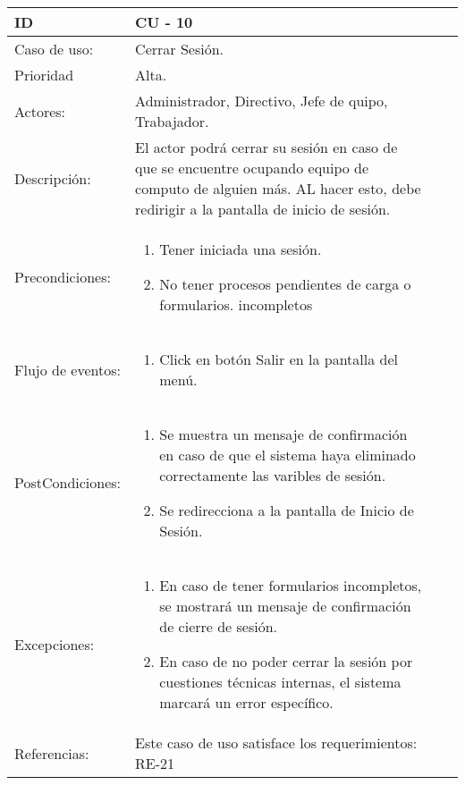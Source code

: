 \documentclass[11pt,a4paper]{article}
\begin{document}
\begin{tabular}[c]{|p{3cm}|p{13cm}|p{2.5cm}|p{3cm}|}
\hline 
\rule[-1ex]{0pt}{2.5ex} ID & CU - 10 \\ 
\hline 
\rule[-1ex]{0pt}{2.5ex} Caso de uso: & Cerrar Sesión. \\ 
\hline 
\rule[-1ex]{0pt}{2.5ex} Prioridad & Alta. \\ 
\hline 
\rule[-1ex]{0pt}{2.5ex} Actores: & Administrador, Directivo, Jefe de quipo, Trabajador.\\ 
\hline 
\rule[-1ex]{0pt}{2.5ex} Descripción: & El actor podrá cerrar su sesión en caso de que se encuentre ocupando
equipo de computo de alguien más. AL hacer esto, debe redirigir a la pantalla de inicio de sesión. \\ 
\hline 
\rule[-1ex]{0pt}{2.5ex}Precondiciones: & \begin{enumerate}
\item Tener iniciada una sesión.
\item No tener procesos pendientes de carga o formularios. incompletos \end{enumerate} \\ 
\hline 
\rule[-1ex]{0pt}{2.5ex} Flujo de eventos: & \begin{enumerate} 
\item Click en botón Salir en la pantalla del menú.
\end{enumerate}
\\ 
\hline 
\rule[-1ex]{0pt}{2.5ex} PostCondiciones:& \begin{enumerate}  
\item Se muestra un mensaje de confirmación en caso de que el sistema haya eliminado correctamente las varibles de sesión.
\item Se redirecciona a la pantalla de Inicio de Sesión.
\end{enumerate} \\ 
\hline 
\rule[-1ex]{0pt}{2.5ex} Excepciones: & \begin{enumerate} 
\item En caso de tener formularios incompletos, se mostrará un mensaje de confirmación de cierre de sesión.

\item En caso de no poder cerrar la sesión por cuestiones técnicas internas, el sistema marcará un error específico.
\end{enumerate} \\ 
\hline 
\rule[-1ex]{0pt}{2.5ex} Referencias: & Este caso de uso satisface los requerimientos: RE-21\\
\hline 

\end{tabular}
\end{document}
